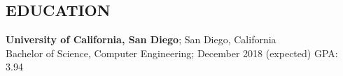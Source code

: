 \documentclass[margin]{res}
\begin{document}
\begin{resume}

\section{EDUCATION}
\textbf{University of California, San Diego}; San Diego, California\\
Bachelor of Science, Computer Engineering; December 2018 (expected)\hfill 
GPA: 3.94


\end{resume}
\end{document}
